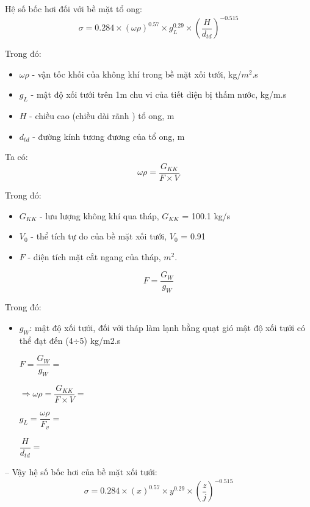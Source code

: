 Hệ số bốc hơi đối với bề mặt tổ ong:
\begin{equation*}
	\sigma = 0.284\times(\omega\rho)^{0.57}\times g_{L}^{0.29}\times\left(\dfrac{H}{d_{td}}\right)^{-0.515}
\end{equation*}

Trong đó:
\begin{itemize}
	\item $\omega\rho$ - vận tốc khối của không khí trong bề mặt xối tưới, kg/$m^2$.s
	\item $g_{L}$ - mật độ xối tưới trên 1m chu vi của tiết diện bị thấm nước, kg/m.s
	\item $H$ - chiều cao (chiều dài rãnh ) tổ ong, m
	\item $d_{td}$ - đường kính tương đương của tổ ong, m
\end{itemize}

Ta có:
\begin{equation*}
	\omega\rho = \dfrac{G_{KK}}{F\times V}
\end{equation*}

Trong đó:
\begin{itemize}
	\item $G_{KK}$ - lưu lượng không khí qua tháp, $G_{KK}$ = 100.1 kg/s
	\item $V_{0}$ - thể tích tự do của bề mặt xối tưới, $V_{0}$ = 0.91 
	\item $F$ - diện tích mặt cắt ngang của tháp, $m^2$.
\end{itemize}

\begin{equation*}
	F = \dfrac{G_{W}}{g_{W}}
\end{equation*}

Trong đó:
\begin{itemize}
	\item $g_{W}$: mật độ xối tưới, đối với tháp làm lạnh bằng quạt gió mật độ xối tưới có thể đạt đến (4$\div$5) kg/m2.s
	
	$F = \dfrac{G_{W}}{g_{W}} = $
	
	$\Longrightarrow \omega\rho = \dfrac{G_{KK}}{F\times V} = $
	
	$g_{L} = \dfrac{\omega\rho}{F_{v}} = $
	
	$\dfrac{H}{d_{td}} = $ 
\end{itemize}

-- Vậy hệ số bốc hơi của bề mặt xối tưới:
\begin{equation*}
	\sigma = 0.284\times(x)^{0.57}\times y^{0.29}\times\left(\dfrac{z}{j}\right)^{-0.515}
\end{equation*}

